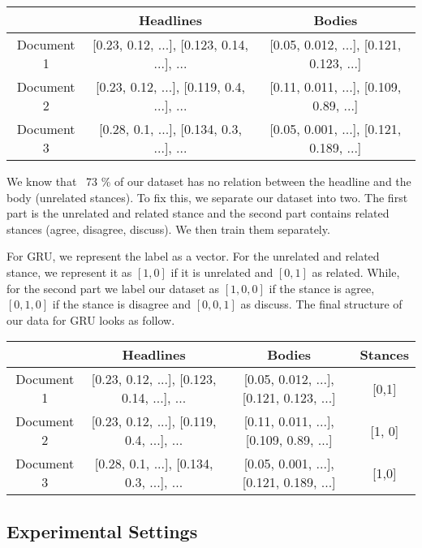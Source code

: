 \documentclass[11.5pt]{article}
\begin{document}
\begin{center}
  \begin{tabular} 
    {|c|c|c|}
    \hline
    & Headlines & Bodies \\
    \hline
    Document 1 & [0.23, 0.12, ...], [0.123, 0.14, ...], ... & [0.05, 0.012, ...], [0.121, 0.123, ...] \\
    \hline
    Document 2 & [0.23, 0.12, ...], [0.119, 0.4, ...], ... & [0.11, 0.011, ...], [0.109, 0.89, ...] \\
    \hline
    Document 3 & [0.28, 0.1, ...], [0.134, 0.3, ...], ... & [0.05, 0.001, ...], [0.121, 0.189, ...] \\
    \hline
  \end{tabular}
\end{center}

We know that ~73 \% of our dataset has no relation between the headline and the body (unrelated stances). To fix this, we separate our dataset into two.
The first part is the unrelated and related stance and the second part contains related stances (agree, disagree, discuss). We then train them separately.

For GRU, we represent the label as a vector. For the unrelated and related stance, we represent it as $[1, 0]$ if it is unrelated and $[0, 1]$ as related.
While, for the second part we label our dataset as $[1, 0, 0]$ if the stance is agree, $[0, 1, 0]$ if the stance is disagree and $[0, 0, 1]$ as discuss. The final structure of our data for GRU looks as follow.

\begin{center}
  \begin{tabular} 
    {|c|c|c|c|}
    \hline
    & Headlines & Bodies & Stances \\
    \hline
    Document 1 & [0.23, 0.12, ...], [0.123, 0.14, ...], ... & [0.05, 0.012, ...], [0.121, 0.123, ...] & [0,1] \\
    \hline
    Document 2 & [0.23, 0.12, ...], [0.119, 0.4, ...], ... & [0.11, 0.011, ...], [0.109, 0.89, ...] & [1, 0] \\
    \hline
    Document 3 & [0.28, 0.1, ...], [0.134, 0.3, ...], ... & [0.05, 0.001, ...], [0.121, 0.189, ...] & [1,0] \\
    \hline
  \end{tabular}
\end{center}

\subsection{Experimental Settings}
\end{document}
